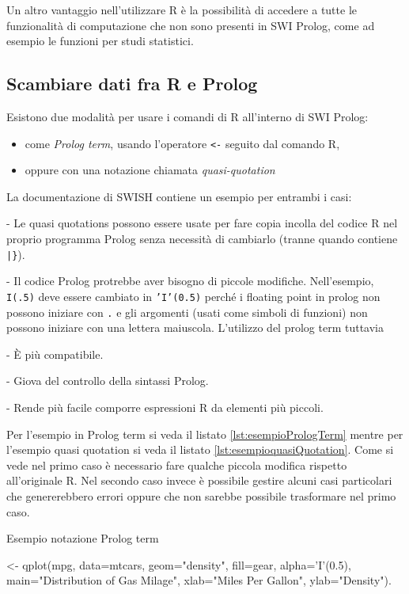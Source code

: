\documentclass[10pt,titlepage,twoside,a4paper]{report}
\newenvironment{code}{\singlespacing\captionsetup{type=listing}}{}
\begin{document}
Un altro vantaggio nell'utilizzare R è la possibilità di accedere a tutte le 
funzionalità di computazione che non sono presenti in SWI Prolog, come ad 
esempio le funzioni per studi statistici.
 
\subsection{Scambiare dati fra R e Prolog}
Esistono due modalità per usare i comandi di R all'interno di SWI Prolog:
\begin{itemize}
    \item come \emph{Prolog term}, usando l'operatore \texttt{<-} 
seguito dal comando R,
    \item oppure con una notazione chiamata \emph{quasi-quotation}
\end{itemize}
La documentazione di SWISH contiene un esempio per entrambi i 
casi\cite{rprolognotations}:
\begin{displayquote}
- Le quasi quotations possono essere usate per fare copia incolla del codice R 
nel proprio programma Prolog senza necessità di cambiarlo (tranne quando 
contiene \texttt{|\}}).

- Il codice Prolog protrebbe aver bisogno di piccole modifiche. Nell'esempio,
  \texttt{I(.5)} deve essere cambiato in \texttt{'I'(0.5)} perché 
  i floating point in prolog non possono iniziare con \texttt{.} e gli 
  argomenti (usati come simboli di funzioni) non possono iniziare con una lettera 
  maiuscola. L'utilizzo del prolog term tuttavia

    - È più compatibile.

    - Giova del controllo della sintassi Prolog.

    - Rende più facile comporre espressioni R da elementi più piccoli.
\end{displayquote}
Per l'esempio in Prolog term si veda il listato \ref{lst:esempioPrologTerm}
mentre per l'esempio quasi quotation si veda il 
listato \ref{lst:esempioquasiQuotation}.
Come si vede nel primo caso è necessario fare qualche piccola modifica 
rispetto all'originale R. Nel secondo caso invece è possibile gestire alcuni 
casi particolari che genererebbero errori oppure che non sarebbe possibile 
trasformare nel primo caso.

\begin{code}
    \caption{Esempio notazione Prolog term}
    \label{lst:esempioPrologTerm}
    \begin{prologcode*}{}
<- qplot(mpg, data=mtcars, geom="density", fill=gear, alpha='I'(0.5), main="Distribution of Gas Milage", xlab="Miles Per Gallon", ylab="Density").
    \end{prologcode*}
\end{code}
\end{document}
